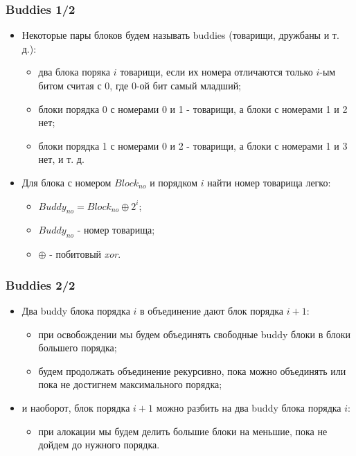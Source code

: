 \begin{frame}
\frametitle{Buddies 1/2}
\begin{itemize}
  \item Некоторые пары блоков будем называть buddies (товарищи, дружбаны и
  т. д.):
  \begin{itemize}
    \item два блока поряка $i$ товарищи, если их номера отличаются только $i$-ым
    битом считая с 0, где 0-ой бит самый младший;
    \item блоки порядка 0 с номерами 0 и 1 - товарищи, а блоки с номерами 1 и 2
    нет;
    \item блоки порядка 1 с номерами 0 и 2 - товарищи, а блоки с номерами 1 и 3
    нет, и т. д.
  \end{itemize}
  \item Для блока с номером $Block_{no}$ и порядком $i$ найти номер товарища
  легко:
  \begin{itemize}
    \item $Buddy_{no} = Block_{no} \oplus 2^i$;
    \item $Buddy_{no}$ - номер товарища;
    \item $\oplus$ - побитовый \emph{xor}.
  \end{itemize}
\end{itemize}
\end{frame}

\begin{frame}
\frametitle{Buddies 2/2}
\begin{itemize}
  \item Два buddy блока порядка $i$ в объединение дают блок порядка $i + 1$:
  \begin{itemize}
    \item при освобождении мы будем объединять свободные buddy блоки в блоки
    большего порядка;
    \item будем продолжать объединение рекурсивно, пока можно объединять или
    пока не достигнем максимального порядка;
  \end{itemize}
  \item и наоборот, блок порядка $i + 1$ можно разбить на два buddy блока
  порядка $i$:
  \begin{itemize}
    \item при алокации мы будем делить большие блоки на меньшие, пока не дойдем
    до нужного порядка.
  \end{itemize}
\end{itemize}
\end{frame}

